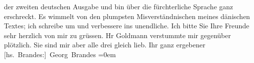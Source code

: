 \begin{ledgroupsized}[t]{13cm}
                    der zweiten deutschen Ausgabe und bin über die fürchterliche Sprache ganz
                    erschreckt. Es wimmelt von den plumpsten Misverständnischen meines dänischen Textes; ich schreibe um und
                    verbessere ins unendliche.\pend
           \pstart
           Ich bitte Sie Ihre Freunde sehr herzlich von mir zu grüssen. Hr Goldmann verstummte mir gegenüber plötzlich. Sie sind mir
                    aber alle drei gleich lieb.\pend
           \pstart
           Ihr ganz ergebener{\\[\baselineskip]}\spacefill\mbox{{[}hs. Brandes:{]} Georg Brandes}\pend
           \leftskip=0em{}
         
         \endnumbering{}\end{ledgroupsized}  \newcommand{\dateiname}{L00701}\newcommand{\titel}{Georg Brandes an Arthur Schnitzler, [13. 7. 1897]}\newcommand{\editorInnen}{Martin Anton Müller und Gerd-Hermann Susen}
      